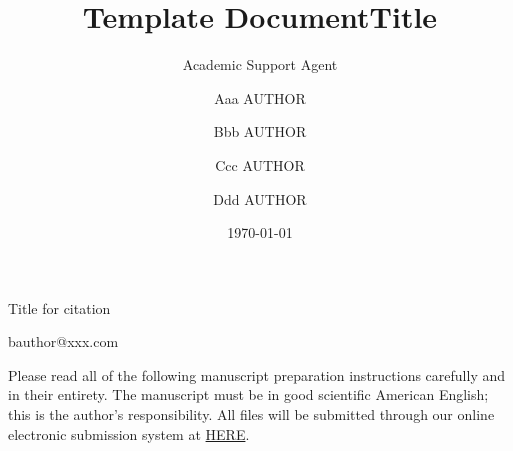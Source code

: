 \documentclass{article}
\title{Template Document}
\author{Academic Support Agent}
\date{\today}
\begin{document}
\maketitle

	\Month{}
	\Vol{}
	\No{}
	\DOI{}
	\ArtNo{}
	\ReceiveDate{}
	\ReviseDate{}
	\AcceptDate{}
	\OnlineDate{}
	
	\title{Title}{Title for citation}
	
	\author[1]{Aaa AUTHOR}{}
        \author[1,2]{Bbb AUTHOR}{{bauthor@xxx.com}}
        \author[2]{Ccc AUTHOR}{}
        \author[3]{Ddd AUTHOR}{}
	
	
	

	\address[1]{Affiliation, City {\rm 000000}, Country}
        \address[2]{Affiliation, City {\rm 000000}, Country}
        \address[3]{Affiliation, City {\rm 000000}, Country}
	
	
	\maketitle
	
	
        Please read all of the following manuscript preparation instructions carefully and in their entirety. The manuscript must be in good scientific American English; this is the author's responsibility. All files will be submitted through our online electronic submission system at \href{https://mc03.manuscriptcentral.com/scis}{HERE}.
%
%
%
% 
% 
%
\end{document}
